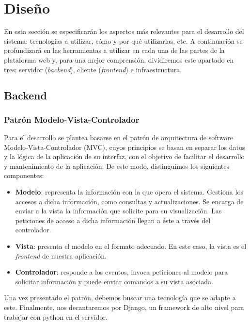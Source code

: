\chapter{Diseño}
\label{cap:disenio}

En esta sección se especificarán los aspectos más relevantes para el desarrollo del sistema: tecnologías a utilizar, cómo y por qué utilizarlas, etc. A continuación se profundizará en las herramientas a utilizar en cada una de las partes de la plataforma web y, para una mejor comprensión, dividiremos este apartado en tres: servidor (\textit{backend}), cliente (\textit{frontend}) e infraestructura.

\section{Backend}

\subsection{Patrón Modelo-Vista-Controlador}

Para el desarrollo se plantea basarse en el patrón de arquitectura de software Modelo-Vista-Controlador (MVC), cuyos principios se basan en separar los datos y la lógica de la aplicación de su interfaz, con el objetivo de facilitar el desarrollo y mantenimiento de la aplicación. De este modo, distinguimos los siguientes componentes:

\begin{itemize}
    \item \textbf{Modelo}: representa la información con la que opera el sistema. Gestiona los accesos a dicha información, como consultas y actualizaciones. Se encarga de enviar a la vista la información que solicite para su visualización. Las peticiones de acceso a dicha información llegan a éste a través del controlador.
    \item \textbf{Vista}: presenta el modelo en el formato adecuado. En este caso, la vista es el \textit{frontend} de nuestra aplicación.
    \item \textbf{Controlador}: responde a los eventos, invoca peticiones al modelo para solicitar información y puede enviar comandos a su vista asociada.
\end{itemize}

Una vez presentado el patrón, debemos buscar una tecnología que se adapte a este. Finalmente, nos decantaremos por Django, un framework de alto nivel para trabajar con python en el servidor.

